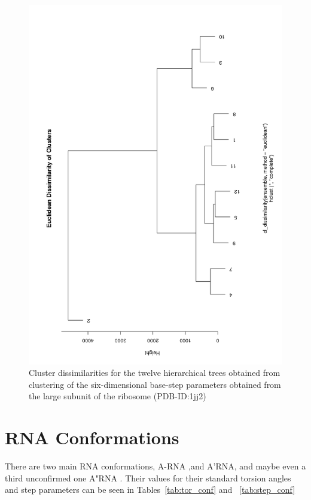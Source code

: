 \begin{figure}[htbp]
\centering
\includegraphics[scale=0.60]{clussdissim.png}
\caption{Cluster dissimilarities for the twelve hierarchical trees
  obtained from clustering of the six-dimensional base-step parameters
obtained from the large subunit of the ribosome (PDB-ID:1jj2)}
\label{fig:clusdis}
\end{figure}


\section{RNA Conformations}
There are two main RNA conformations, A-RNA ,and A'RNA, and maybe even a
third unconfirmed one A"RNA \cite{saenger1984}.
Their values for their standard torsion angles and step parameters can be seen
in Tables~\ref{tab:tor_conf} and ~\ref{tab:step_conf} 

